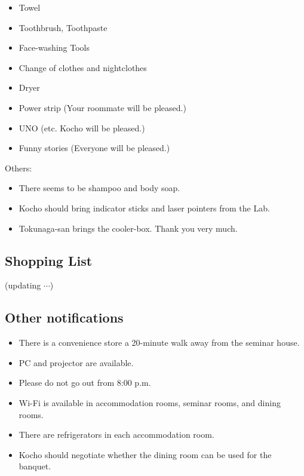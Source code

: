 \documentclass[unicode,a4paper,11pt]{ltjsarticle}
\begin{document}
\begin{itemize}
  \item
        Towel
  \item
        Toothbrush, Toothpaste
  \item
        Face-washing Tools
  \item
        Change of clothes and nightclothes
  \item
        Dryer
  \item
        Power strip (Your roommate will be pleased.)
  \item
        UNO (etc. Kocho will be pleased.)
  \item
        Funny stories (Everyone will be pleased.)
\end{itemize}

Others:
\begin{itemize}
  \item
        There seems to be shampoo and body soap.
  \item
        Kocho should bring indicator sticks and laser pointers from the Lab.
  \item
        Tokunaga-san brings the cooler-box. Thank you very much.
\end{itemize}


\subsection*{Shopping List}

(updating $\cdots$)


\subsection*{Other notifications}

\begin{itemize}
  \item
        There is a convenience store a 20-minute walk away from the seminar house.
  \item
        PC and projector are available.
  \item
        Please do not go out from 8:00 p.m.
  \item
        Wi-Fi is available in accommodation rooms, seminar rooms, and dining rooms.
  \item
        There are refrigerators in each accommodation room.
  \item
        Kocho should negotiate whether the dining room can be used for the banquet.
\end{itemize}
\end{document}
